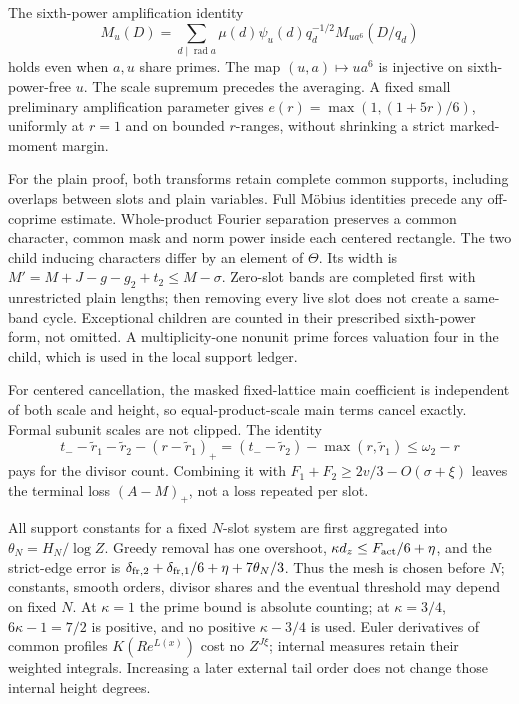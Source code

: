 \documentclass[12pt]{article}
\begin{document}
The sixth-power amplification identity
\[
 M_u(D)=\sum_{d\mid\operatorname{rad}a}
 \mu(d)\psi_u(d)q_d^{-1/2}M_{ua^6}(D/q_d)
\]
holds even when \(a,u\) share primes.  The map \((u,a)\mapsto ua^6\)
is injective on sixth-power-free \(u\).  The scale supremum precedes
the averaging.  A fixed small preliminary amplification parameter
gives \(e(r)=\max(1,(1+5r)/6)\), uniformly at \(r=1\) and on
bounded \(r\)-ranges, without shrinking a strict marked-moment margin.

For the plain proof, both transforms retain complete common supports,
including overlaps between slots and plain variables.  Full
M\"obius identities precede any off-coprime estimate.  Whole-product
Fourier separation preserves a common character, common mask and
norm power inside each centered rectangle.  The two child inducing
characters differ by an element of \(\Theta\).
Its width is \(M'=M+J-g-g_2+t_2\le M-\sigma\).
Zero-slot bands are completed first with unrestricted plain lengths;
then removing every live slot does not create a same-band cycle.
Exceptional children are counted in their prescribed sixth-power
form, not omitted.  A multiplicity-one nonunit prime forces valuation
four in the child, which is used in the local support ledger.

For centered cancellation, the masked fixed-lattice main coefficient
is independent of both scale and height, so equal-product-scale
main terms cancel exactly.  Formal subunit scales are not clipped.
The identity
\[
 t_- -\widetilde r_1-\widetilde r_2-(r-\widetilde r_1)_+
 =(t_- -\widetilde r_2)-\max(r,\widetilde r_1)\le\omega_2-r
\]
pays for the divisor count.  Combining it with
\(F_1+F_2\ge2v/3-O(\sigma+\xi)\) leaves the terminal loss
\((A-M)_+\), not a loss repeated per slot.

All support constants for a fixed \(N\)-slot system are first
aggregated into \(\theta_N=H_N/\log Z\).
Greedy removal has one overshoot,
\(\kappa d_z\le F_{\rm act}/6+\eta\), and the strict-edge error
is \(\delta_{\rm fr,2}+\delta_{\rm fr,1}/6+\eta+7\theta_N/3\).
Thus the mesh is chosen before \(N\); constants, smooth orders,
divisor shares and the eventual threshold may depend on fixed \(N\).
At \(\kappa=1\) the prime bound is absolute counting; at
\(\kappa=3/4\), \(6\kappa-1=7/2\) is positive, and no positive
\(\kappa-3/4\) is used.  Euler derivatives of common profiles
\(K(R e^{L(x)})\) cost no \(Z^{J\xi}\); internal measures retain
their weighted integrals.  Increasing a later external tail order
does not change those internal height degrees.
\end{document}
